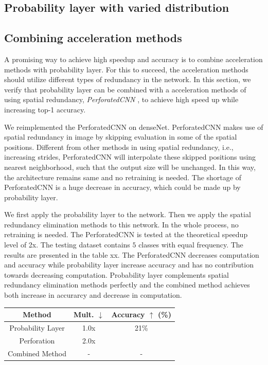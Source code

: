 \documentclass{article}
\begin{document}

\subsection{Probability layer with varied distribution}



\subsection{Combining acceleration methods}
A promising way to achieve high speedup and accuracy is to combine acceleration methods with probability layer. For this to succeed, the acceleration methods should utilize different types of redundancy in the network. In this section, we verify that probability layer can be combined with a acceleration methods of using spatial redundancy, \textit{PerforatedCNN} \cite{figurnov2016perforatedcnns}, to achieve high speed up while increasing top-1 accuracy.

We reimplemented the PerforatedCNN \cite{figurnov2016perforatedcnns} on denseNet. PerforatedCNN makes use of spatial redundancy in image by skipping evaluation in some of the spatial positions. Different from other methods in using spatial redundancy, i.e., increasing strides, PerforatedCNN will interpolate these skipped positions using nearest neighborhood, such that the output size will be unchanged. In this way, the architecture remains same and no retraining is needed. The shortage of PerforatedCNN is a huge decrease in accuracy, which could be made up by probability layer.

We first apply the probability layer to the network. Then we apply the spatial redundancy elimination methods to this network. In the whole process, no retraining is needed. The PerforatedCNN is tested at the theoretical speedup level of 2x. The testing dataset contains $5$ classes with equal frequency. The results are presented in the table xx. The PerforatedCNN decreases computation and accuracy while probability layer increase accuracy and has no contribution towards decreasing computation. Probability layer complements spatial redundancy elimination methods perfectly and the combined method achieves both increase in accurarcy and decrease in computation.

\begin{center}
\begin{tabular}{ c|c|c } 
 Method & Mult. $\downarrow$ & Accuracy $\uparrow$ (\%) \\ 
 \hline
 Probability Layer & 1.0x & 21\% \\ 
 Perforation & 2.0x & \\ 
 \hline
 Combined Method & - & -
\end{tabular}
\end{center}
\end{document}
